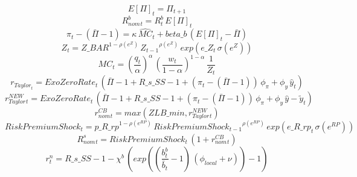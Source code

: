 \begin{dmath}
{ E[\Pi] _{t}}={ \Pi _{t+1}}
\end{dmath}
\begin{dmath}
{ R^b_{nom}_{t}}={R^b_{t}}\, { E[\Pi] _{t}}
\end{dmath}
\begin{dmath}
{ \pi _{t}}-\left({ \bar{\Pi} }-1\right)={\kappa}\, { \hat{MC} _{t}}+{beta\_b}\, \left({ E[\Pi] _{t}}-{ \bar{\Pi} }\right)
\end{dmath}
\begin{dmath}
{Z_{t}}={Z\_BAR}^{1-{ \rho(e^Z) }}\, {Z_{t-1}}^{{ \rho(e^Z) }}\, exp\left({e\_Z_{t}}\, { \sigma(e^Z) }\right)
\end{dmath}
\begin{dmath}
{MC_{t}}=\left(\frac{{q_{t}}}{{\alpha }}\right)^{{\alpha }}\, \left(\frac{{w_{t}}}{1-{\alpha }}\right)^{1-{\alpha }}\, \frac{1}{{Z_{t}}}
\end{dmath}
\begin{dmath}
{ r_{Taylor} _{t}}={ExoZeroRate_{t}}\, \left({ \bar{\Pi} }-1+{R\_s\_SS}-1+\left({ \pi _{t}}-\left({ \bar{\Pi} }-1\right)\right)\, {\phi_{\pi}}+{\phi_{y}}\, { \hat{y} _{t}}\right)
\end{dmath}
\begin{dmath}
{ r_{Taylor}^{NEW} _{t}}={ExoZeroRate_{t}}\, \left({ \bar{\Pi} }-1+{R\_s\_SS}-1+\left({ \pi _{t}}-\left({ \bar{\Pi} }-1\right)\right)\, {\phi_{\pi}}+{\phi_{y}}\, { \hat{y} - \tilde{y} _{t}}\right)
\end{dmath}
\begin{dmath}
{ r^{CB}_{nom}_{t}}=max({ZLB\_min},{ r_{Taylor}^{NEW} _{t}})
\end{dmath}
\begin{dmath}
{ Risk Premium Shock _{t}}={p\_R\_rp}^{1-{\rho(e^{RP}) }}\, { Risk Premium Shock _{t-1}}^{{\rho(e^{RP}) }}\, exp\left({e\_R\_rp_{t}}\, {\sigma(e^{RP}) }\right)
\end{dmath}
\begin{dmath}
{ R^s_{nom}_{t}}={ Risk Premium Shock _{t}}\, \left(1+{ r^{CB}_{nom}_{t}}\right)
\end{dmath}
\begin{dmath}
{ r^n _{t}}={R\_s\_SS}-1-{\chi^b }\, \left(exp\left(\left(\frac{{b^b_{t}}}{{ \bar{b} _{t}}}-1\right)\, \left({\phi_{local}}+{\nu }\right)\right)-1\right)
\end{dmath}
